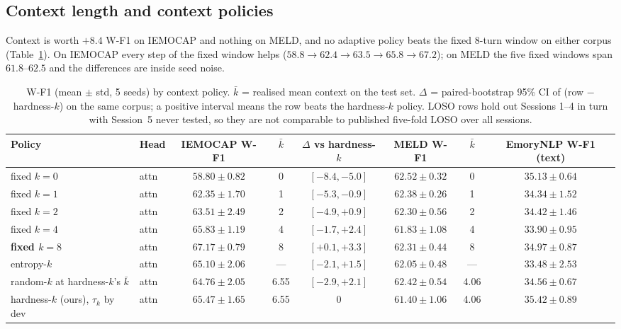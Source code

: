 \documentclass[journal]{IEEEtran}
\newcommand{\wf}{W-F1}
\newcommand{\kbar}{\bar{k}}
\begin{document}
\subsection{Context length and context policies}\label{sec:policies}
Context is worth $+8.4$ \wf{} on IEMOCAP and nothing on MELD, and no adaptive policy beats the fixed 8-turn window on either corpus (Table~\ref{tab:policies}). On IEMOCAP every step of the fixed window helps ($58.8 \rightarrow 62.4 \rightarrow 63.5 \rightarrow 65.8 \rightarrow 67.2$); on MELD the five fixed windows span $61.8$--$62.5$ and the differences are inside seed noise.

\begin{table}[t]\centering\footnotesize\setlength{\tabcolsep}{3pt}
\caption{\wf{} (mean $\pm$ std, 5 seeds) by context policy. $\kbar$ = realised mean context on the test set. $\Delta$ = paired-bootstrap 95\% CI of (row $-$ hardness-$k$) on the same corpus; a positive interval means the row beats the hardness-$k$ policy. LOSO rows hold out Sessions 1--4 in turn with Session~5 never tested, so they are not comparable to published five-fold LOSO over all sessions.}\label{tab:policies}
\begin{tabular}{llcccccc}\toprule
Policy & Head & IEMOCAP \wf & $\kbar$ & $\Delta$ vs hardness-$k$ & MELD \wf & $\kbar$ & EmoryNLP \wf{} (text) \\ \midrule
fixed $k=0$ & attn & $58.80 \pm 0.82$ & 0 & $[-8.4, -5.0]$ & $62.52 \pm 0.32$ & 0 & $35.13 \pm 0.64$ \\
fixed $k=1$ & attn & $62.35 \pm 1.70$ & 1 & $[-5.3, -0.9]$ & $62.38 \pm 0.26$ & 1 & $34.34 \pm 1.52$ \\
fixed $k=2$ & attn & $63.51 \pm 2.49$ & 2 & $[-4.9, +0.9]$ & $62.30 \pm 0.56$ & 2 & $34.42 \pm 1.46$ \\
fixed $k=4$ & attn & $65.83 \pm 1.19$ & 4 & $[-1.7, +2.4]$ & $61.83 \pm 1.08$ & 4 & $33.90 \pm 0.95$ \\
\textbf{fixed $k=8$} & attn & $\mathbf{67.17 \pm 0.79}$ & 8 & $\mathbf{[+0.1, +3.3]}$ & $62.31 \pm 0.44$ & 8 & $34.97 \pm 0.87$ \\
entropy-$k$ & attn & $65.10 \pm 2.06$ & --- & $[-2.1, +1.5]$ & $62.05 \pm 0.48$ & --- & $33.48 \pm 2.53$ \\
random-$k$ at hardness-$k$'s $\kbar$ & attn & $64.76 \pm 2.05$ & 6.55 & $[-2.9, +2.1]$ & $62.42 \pm 0.54$ & 4.06 & $34.56 \pm 0.67$ \\
hardness-$k$ (ours), $\tau_k$ by dev & attn & $65.47 \pm 1.65$ & 6.55 & 0 & $61.40 \pm 1.06$ & 4.06 & $35.42 \pm 0.89$ \\

\end{tabular}
\end{table}
\end{document}
